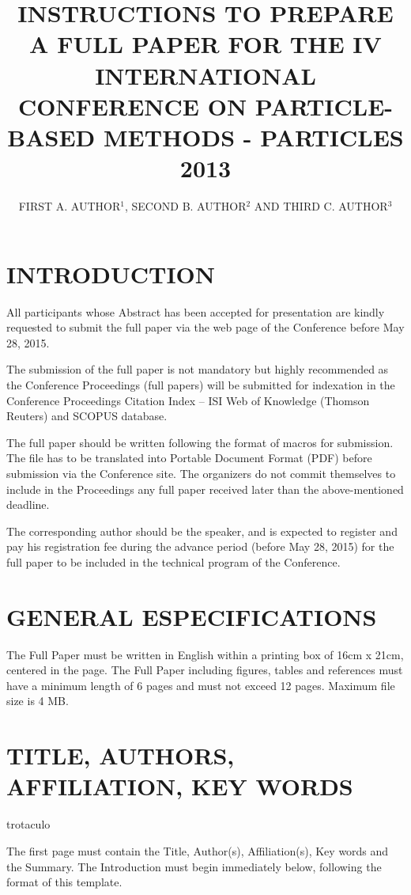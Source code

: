 \documentclass{particles2015}
\title{INSTRUCTIONS TO PREPARE A FULL PAPER FOR THE IV INTERNATIONAL CONFERENCE ON PARTICLE-BASED METHODS - PARTICLES 2013}
\author{FIRST A. AUTHOR$^1$, SECOND B. AUTHOR$^2$ AND THIRD C. AUTHOR$^3$}
\begin{document}

\section{INTRODUCTION}

All participants whose Abstract has been accepted for presentation are kindly requested to submit the full paper via the web page of the Conference before May 28, 2015.

The submission of the full paper is not mandatory but highly recommended as the Conference Proceedings (full papers) will be submitted for indexation in the Conference Proceedings Citation Index – ISI Web of Knowledge (Thomson Reuters) and SCOPUS database.

The full paper should be written following the format of macros for submission. The file has to be translated into Portable Document Format (PDF) before submission via the Conference site. The organizers do not commit themselves to include in the Proceedings any full paper received later than the above-mentioned deadline.

The corresponding author should be the speaker, and is expected to register and pay his registration fee during the advance period (before May 28, 2015) for the full paper to be included in the technical program of the Conference.


\section{GENERAL ESPECIFICATIONS}

The Full Paper must be written in English within a printing box of 16cm x 21cm, centered in the page. The Full Paper including figures, tables and references must have a minimum length of 6 pages and must not exceed 12 pages. Maximum file size is 4 MB.

\section{TITLE, AUTHORS, AFFILIATION, KEY WORDS}

trotaculo 

The first page must contain the Title, Author(s), Affiliation(s),
Key words and the Summary. The Introduction must begin immediately
below, following the format of this template.
\end{document}

